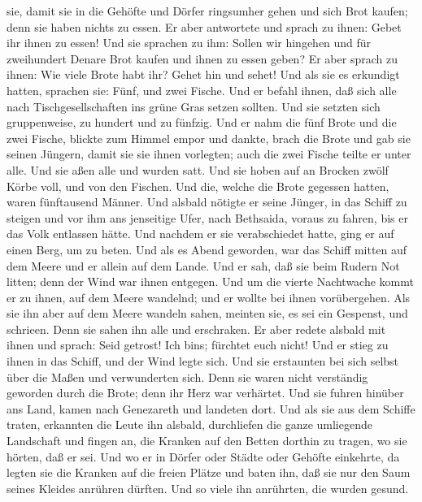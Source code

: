 sie, damit sie in die Gehöfte und Dörfer ringsumher gehen und sich Brot
kaufen; denn sie haben nichts zu essen.  Er aber
antwortete und sprach zu ihnen: Gebet ihr ihnen zu essen! Und sie
sprachen zu ihm: Sollen wir hingehen und für zweihundert Denare Brot
kaufen und ihnen zu essen geben?  Er aber sprach zu
ihnen: Wie viele Brote habt ihr? Gehet hin und sehet! Und als sie es
erkundigt hatten, sprachen sie: Fünf, und zwei Fische. 
Und er befahl ihnen, daß sich alle nach Tischgesellschaften ins grüne
Gras setzen sollten.  Und sie setzten sich gruppenweise,
zu hundert und zu fünfzig.  Und er nahm die fünf Brote
und die zwei Fische, blickte zum Himmel empor und dankte, brach die
Brote und gab sie seinen Jüngern, damit sie sie ihnen vorlegten; auch
die zwei Fische teilte er unter alle.  Und sie aßen alle
und wurden satt.  Und sie hoben auf an Brocken zwölf
Körbe voll, und von den Fischen.  Und die, welche die
Brote gegessen hatten, waren fünftausend Männer.  Und
alsbald nötigte er seine Jünger, in das Schiff zu steigen und vor ihm
ans jenseitige Ufer, nach Bethsaida, voraus zu fahren, bis er das Volk
entlassen hätte.  Und nachdem er sie verabschiedet hatte,
ging er auf einen Berg, um zu beten.  Und als es Abend
geworden, war das Schiff mitten auf dem Meere und er allein auf dem
Lande.  Und er sah, daß sie beim Rudern Not litten; denn
der Wind war ihnen entgegen. Und um die vierte Nachtwache kommt er zu
ihnen, auf dem Meere wandelnd; und er wollte bei ihnen vorübergehen.
 Als sie ihn aber auf dem Meere wandeln sahen, meinten
sie, es sei ein Gespenst, und schrieen.  Denn sie sahen
ihn alle und erschraken. Er aber redete alsbald mit ihnen und sprach:
Seid getrost! Ich bin\textquotesingle s; fürchtet euch nicht!
 Und er stieg zu ihnen in das Schiff, und der Wind legte
sich. Und sie erstaunten bei sich selbst über die Maßen und verwunderten
sich.  Denn sie waren nicht verständig geworden durch die
Brote; denn ihr Herz war verhärtet.  Und sie fuhren
hinüber ans Land, kamen nach Genezareth und landeten dort.
 Und als sie aus dem Schiffe traten, erkannten die Leute
ihn alsbald,  durchliefen die ganze umliegende Landschaft
und fingen an, die Kranken auf den Betten dorthin zu tragen, wo sie
hörten, daß er sei.  Und wo er in Dörfer oder Städte oder
Gehöfte einkehrte, da legten sie die Kranken auf die freien Plätze und
baten ihn, daß sie nur den Saum seines Kleides anrühren dürften. Und so
viele ihn anrührten, die wurden gesund.

